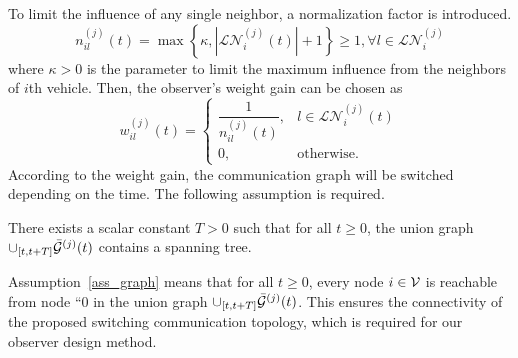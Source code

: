 To limit the influence of any single neighbor, a normalization factor is introduced.
\begin{equation}\label{new_setneibor}
n_{il}^{(j)}(t)=\max \left\{\kappa,\left|\mathcal{LN}_i^{(j)}(t)\right|+1\right\} \geq 1, \forall l\in \mathcal{LN}_i^{(j)}
\end{equation}
where $\kappa >0$ is the parameter to limit the maximum influence from the neighbors of $i$th vehicle. 
Then, the observer's weight gain can be chosen as
\begin{equation}\label{design_gain}
    w_{il}^{(j)}(t) = \begin{cases}
        \dfrac{1}{n_{il}^{(j)}(t)}, & l \in \mathcal{LN}_i^{(j)}(t)\\
        0 ,& \text{otherwise}.
    \end{cases}
\end{equation}
%
According to the weight gain, the communication graph will be switched depending on the time. The following assumption is required.
\begin{assumption}%
\label{ass_graph}
There exists a scalar constant $T > 0$ such that for all $t\geq 0$, the union graph $\cup _{[t, t+ T]}\bar{\mathcal{G}}^{(j)}(t)$ contains a spanning tree.
\end{assumption}
Assumption~\ref{ass_graph} means that for all $t\geq 0$, every node $i \in\mathcal{V}$ is reachable from node ``0 in the union graph $\cup _{[t, t+ T]}\bar{\mathcal{G}}^{(j)}(t)$. This ensures the connectivity of the proposed switching communication topology, which is required for our observer design method.




